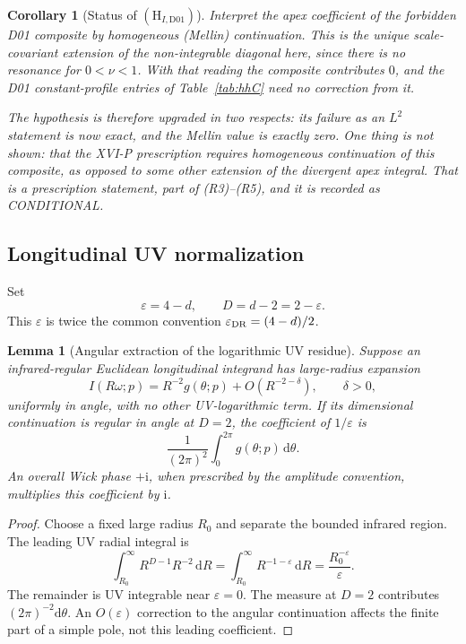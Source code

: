 \documentclass[11pt,a4paper]{article}
\newcommand{\dd}{\mathrm d}
\newcommand{\ii}{\mathrm i}
\newcommand{\eps}{\varepsilon}
\newcommand{\CONDITIONAL}{\textsf{CONDITIONAL}}
\theoremstyle{plain}
\newtheorem{lemma}[theorem]{Lemma}
\newtheorem{corollary}[theorem]{Corollary}
\theoremstyle{definition}
\theoremstyle{remark}
\numberwithin{equation}{section}
\begin{document}
\begin{corollary}[Status of \((\mathrm H_{I,\mathrm{D01}})\)]
\label{cor:HI}
Interpret the apex coefficient of the forbidden D01 composite by
homogeneous (Mellin) continuation.
This is the unique scale-covariant extension of the
non-integrable diagonal here, since there is no resonance for
\(0<\nu<1\).
With that reading the composite contributes \(0\), and the D01
constant-profile entries of Table~\ref{tab:hhC} need no correction
from it.

The hypothesis is therefore \emph{upgraded} in two respects: its
failure as an \(L^2\) statement is now exact, and the Mellin value
is exactly zero.
One thing is not shown: that the XVI-P prescription requires
homogeneous continuation of this composite, as opposed to some
other extension of the divergent apex integral.
That is a prescription statement, part of (R3)--(R5), and it is
recorded as \CONDITIONAL.
\end{corollary}

\subsection{Longitudinal UV normalization}

Set
\[
\eps=4-d,\qquad D=d-2=2-\eps.
\]
This \(\eps\) is twice the common convention
\(\eps_{\rm DR}=(4-d)/2\).

\begin{lemma}[Angular extraction of the logarithmic UV residue]
\label{lem:UV}
Suppose an infrared-regular Euclidean longitudinal integrand has
large-radius expansion
\[
I(R\omega;p)=R^{-2}g(\theta;p)+O(R^{-2-\delta}),
\qquad \delta>0,
\]
uniformly in angle, with no other UV-logarithmic term.
If its dimensional continuation is regular in angle at \(D=2\),
the coefficient of \(1/\eps\) is
\begin{equation}
\frac1{(2\pi)^2}
 \int_0^{2\pi}g(\theta;p)\,\dd\theta.
\label{eq:UVangle}
\end{equation}
An overall Wick phase \(+\ii\), when prescribed by the amplitude
convention, multiplies this coefficient by \(\ii\).
\end{lemma}

\begin{proof}
Choose a fixed large radius \(R_0\) and separate the bounded
infrared region. The leading UV radial integral is
\[
\int_{R_0}^\infty R^{D-1}R^{-2}\,\dd R
 =\int_{R_0}^\infty R^{-1-\eps}\,\dd R
 =\frac{R_0^{-\eps}}{\eps}.
\]
The remainder is UV integrable near \(\eps=0\).
The measure at \(D=2\) contributes \((2\pi)^{-2}\dd\theta\).
An \(O(\eps)\) correction to the angular continuation affects
the finite part of a simple pole, not this leading coefficient.
\end{proof}
\end{document}
